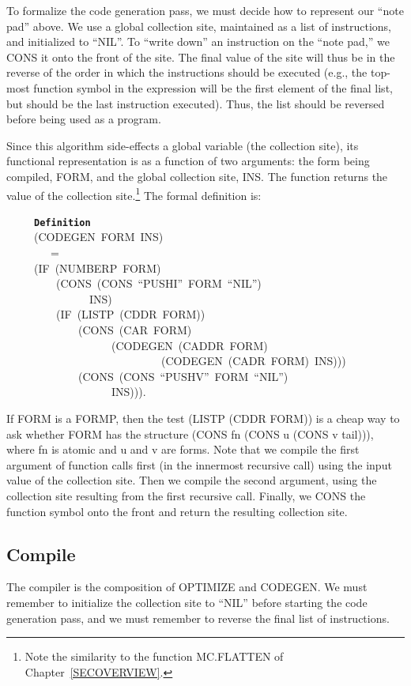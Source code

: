 \documentclass[11pt]{book}
\newenvironment{pubasis}{\begin{flushleft}\ttfamily\small}{\normalsize\rmfamily\end{flushleft}}
\newcommand{\axiomordefinition}[1]{\vspace{6pt}\texttt{\textbf{#1}}}
\newcommand{\pubdefaulttextsize}{\large}
\begin{document}
To formalize the code generation pass, we must   decide how to represent our
``note pad'' above.  We  use a global
collection site, maintained as a list of instructions, and initialized to ``NIL''.
To ``write down'' an instruction on the ``note pad,'' we CONS it onto the front of the site.
The final value of the site
will thus be in the reverse of the order in which the instructions
should be executed (e.g., the top-most function symbol in
the expression will be the first element of the final list, but should
be the last instruction executed).  Thus, the list should be reversed
before being used as a program.

Since this algorithm side-effects a global variable (the collection site),
its functional representation is as a function of two arguments: the form being
compiled, FORM, and the global collection site, INS.  The function returns
the value of the collection site.\footnote{Note the similarity to the function MC.FLATTEN of Chapter~\ref{SECOVERVIEW}.}  The formal definition is:
\begin{pubasis}
~~~~~\axiomordefinition{Definition}\\
~~~~~(CODEGEN~FORM~INS)\\
~~~~~~~~=\\
~~~~~(IF~(NUMBERP~FORM)\\
~~~~~~~~~(CONS~(CONS~``PUSHI''~FORM~``NIL'')\\
~~~~~~~~~~~~~~~INS)\\
~~~~~~~~~(IF~(LISTP~(CDDR~FORM))\\
~~~~~~~~~~~~~(CONS~(CAR~FORM)\\
~~~~~~~~~~~~~~~~~~~(CODEGEN~(CADDR~FORM)\\
~~~~~~~~~~~~~~~~~~~~~~~~~~~~(CODEGEN~(CADR~FORM)~INS)))\\
~~~~~~~~~~~~~(CONS~(CONS~``PUSHV''~FORM~``NIL'')\\
~~~~~~~~~~~~~~~~~~~INS))).\\
\end{pubasis}
If FORM is a FORMP, then
the test (LISTP (CDDR FORM)) is   a cheap way to ask whether FORM has
the structure (CONS fn (CONS u (CONS v tail))), where fn is atomic and u and v
are forms.  Note that we compile the first argument of function calls
first (in the innermost recursive call) using the input value of the
collection site.  Then we compile the second argument, using the collection
site resulting from the first recursive call.  Finally, we CONS the function
symbol onto the front and return the resulting collection site.
\subsection{Compile}
\pubdefaulttextsize
The compiler is   the composition of OPTIMIZE
and CODEGEN.  We must remember to initialize the collection site to ``NIL''
before starting the code generation pass, and we must remember to reverse
the final list of instructions.
\end{document}
